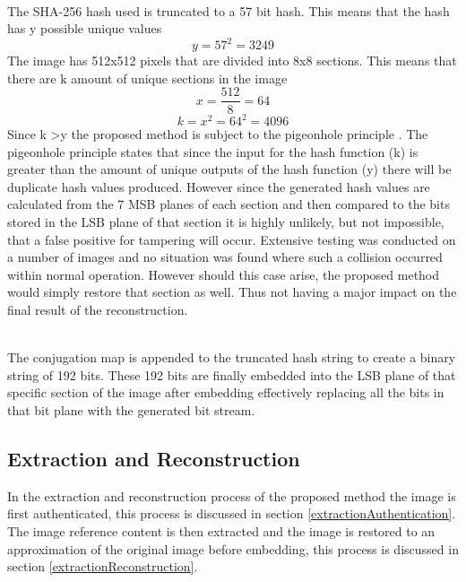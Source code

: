 \documentclass[12pt]{article}
\begin{document}
\hspace{0pt} \\
The SHA-256 hash used is truncated to a 57 bit hash. 
This means that the hash has y possible unique values 
\[ y = 57^2 = 3249 \]
The image has 512x512 pixels that are divided into 8x8 sections.
This means that there are k amount of unique sections in the image
\[x = \frac{512}{8} = 64 \]
\[k = x^2 =64^2 = 4096 \]
Since k \textgreater y the proposed method is subject to the pigeonhole principle \cite{cook1976short}.
The pigeonhole principle states that since the input for the hash function (k) is greater than the amount of unique outputs of the hash function (y) there will be duplicate hash values produced.
However since the generated hash values are calculated from the 7 MSB planes of each section and then compared to the bits stored in the LSB plane of that section it is highly unlikely, but not impossible, that a false positive for tampering will occur.
Extensive testing was conducted on a number of images and no situation was found where such a collision occurred within normal operation.
However should this case arise, the proposed method would simply restore that section as well.
Thus not having a major impact on the final result of the reconstruction.

\hspace{0pt} \\
The conjugation map is appended to the truncated hash string to create a binary string of 192 bits.
These 192 bits are finally embedded into the LSB plane of that specific section of the image after embedding effectively replacing all the bits in that bit plane with the generated bit stream.

\subsection{Extraction and Reconstruction}
\label{extractRestore}
In the extraction and reconstruction process of the proposed method the image is first authenticated, this process is discussed in section \ref{extractionAuthentication}. 
The image reference content is then extracted and the image is restored to an approximation of the original image before embedding, this process is discussed in section \ref{extractionReconstruction}.
\end{document}
